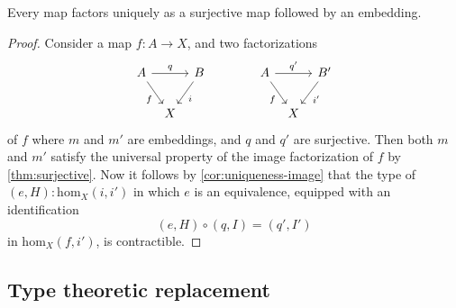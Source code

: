 \begin{cor}
  Every map factors uniquely as a surjective map followed by an embedding.
\end{cor}

\begin{proof}
  Consider a map $f:A\to X$, and two factorizations
  \begin{equation*}
    \begin{tikzcd}[column sep=tiny]
      A \arrow[rr,"q"] \arrow[dr,swap,"f"] & & B \arrow[dl,"i"] &[3em] A \arrow[rr,"{q'}"] \arrow[dr,swap,"f"] & & B' \arrow[dl,"{i'}"] \\
      & X & & & X
    \end{tikzcd}
  \end{equation*}
  of $f$ where $m$ and $m'$ are embeddings, and $q$ and $q'$ are surjective. Then both $m$ and $m'$ satisfy the universal property of the image factorization of $f$ by \cref{thm:surjective}. Now it follows by \cref{cor:uniqueness-image} that the type of $(e,H):\mathrm{hom}_X(i,i')$ in which $e$ is an equivalence, equipped with an identification
  \begin{equation*}
    (e,H)\circ(q,I)=(q',I')
  \end{equation*}
  in $\mathrm{hom}_X(f,i')$, is contractible.
\end{proof}

\subsection{Type theoretic replacement}

\begin{comment}
We have constructed the set quotient $A/R$ as the image of the equivalence relation
\begin{equation*}
  R:A\to \UU^A.
\end{equation*}
However, the type $\UU^A$ is itself in the next universe $\UU^+$. Hence the quotient is also in the universe $\UU^+$. We prove in this section that $A/R$ is nevertheless equivalent to a type in $\UU$. In other words, we show that $A/R$ is \emph{essentially} small.
\end{comment}

